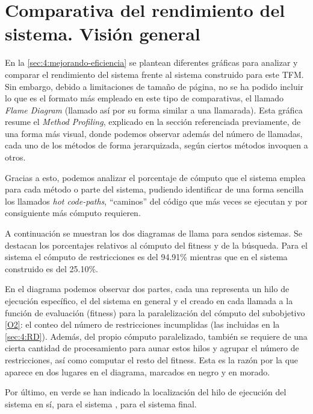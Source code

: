 \graphicspath{{anexos/AnexoC-Flame-Diagram/recursos/}}

\section{Comparativa del rendimiento del sistema. Visión general} \label{Anexo:flame-diagram}

En la \autoref{sec:4:mejorando-eficiencia} se plantean diferentes gráficas para analizar y comparar el rendimiento del sistema \legacy{} frente al sistema construido para este TFM. Sin embargo, debido a limitaciones de tamaño de página, no se ha podido incluir lo que es el formato más empleado en este tipo de comparativas, el llamado \textit{Flame Diagram} (llamado así por su forma similar a una llamarada). Esta gráfica resume el \textit{Method Profiling}, explicado en la sección referenciada previamente, de una forma más visual, donde podemos observar además del número de llamadas, cada uno de los métodos de forma jerarquizada, según ciertos métodos invoquen a otros.

Gracias a esto, podemos analizar el porcentaje de cómputo que el sistema emplea para cada método o parte del sistema, pudiendo identificar de una forma sencilla los llamados \textit{hot code-paths}, ``caminos'' del código que más veces se ejecutan y por consiguiente más cómputo requieren.

A continuación se muestran los dos diagramas de llama para sendos sistemas. Se destacan los porcentajes relativos al cómputo del fitness y de la búsqueda. Para el sistema \legacy{} el cómputo de restricciones es del 94.91\% mientras que en el sistema construido es del 25.10\%.

En el diagrama podemos observar dos partes, cada una representa un hilo de ejecución específico, el del sistema en general y el creado en cada llamada a la función de evaluación (fitness) para la paralelización del cómputo del subobjetivo \ref{O2}: el conteo del número de restricciones incumplidas (las incluidas en la \autoref{sec:4:RD}). Además, del propio cómputo paralelizado, también se requiere de una cierta cantidad de procesamiento para aunar estos hilos y agrupar el número de restricciones, así como computar el resto del fitness. Esta es la razón por la que aparece en dos lugares en el diagrama, marcados en negro y en morado.

Por último, en verde se han indicado la localización del hilo de ejecución del sistema en sí, \sa{} para el sistema \legacy{}, \vns{} para el sistema final.

\begin{landscape}
	
\end{landscape}
